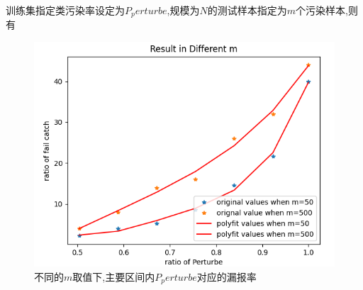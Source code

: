 
训练集指定类污染率设定为$P_perturbe$,规模为$N$的测试样本指定为$m$个污染样本,则有
\begin{figure}
	\centering
	\includegraphics[scale=0.7]{Figures/tutu.png}
	\caption{不同的$m$取值下,主要区间内$P_perturbe$对应的漏报率}
\end{figure}


